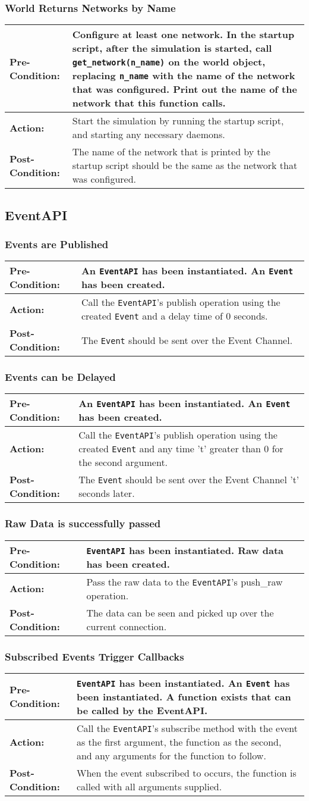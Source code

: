 \documentclass[titlepage]{article}
\newcommand{\testcase}[3]{
    \begin{center}
    \begin{tabular}{| l | p{0.7\textwidth}|}
        \hline
        \rowcolor[gray]{0.8}\textbf{Pre-Condition:} & #1 \\ \hline
        \textbf{Action:} & #2 \\ \hline
        \rowcolor[gray]{0.8}\textbf{Post-Condition:} & #3 \\ \hline
    \end{tabular}
    \end{center}
}
\begin{document}
\subsubsection{World Returns Networks by Name}
\testcase{Configure at least one network.  In the startup script, after the simulation is started, call \texttt{get\_network(n\_name)} on the world object, replacing \texttt{n\_name} with the name of the network that was configured.  Print out the name of the network that this function calls.}{Start the simulation by running the startup script, and starting any necessary daemons.}{The name of the network that is printed by the startup script should be the same as the network that was configured.}

\subsection{EventAPI}
\subsubsection{Events are Published}
\testcase{An \texttt{EventAPI} has been instantiated. An \texttt{Event} has been created.}{Call the \texttt{EventAPI}'s publish operation using the created \texttt{Event} and a delay time of 0 seconds.}{The \texttt{Event} should be sent over the Event Channel.}

\subsubsection{Events can be Delayed}
\testcase{An \texttt{EventAPI} has been instantiated. An \texttt{Event} has been created.}{Call the \texttt{EventAPI}'s publish operation using the created \texttt{Event} and any time 't' greater than 0 for the second argument.}{The \texttt{Event} should be sent over the Event Channel 't' seconds later.}

\subsubsection{Raw Data is successfully passed}
\testcase{\texttt{EventAPI} has been instantiated. Raw data has been created.}{Pass the raw data to the \texttt{EventAPI}'s push\_raw operation.}{The data can be seen and picked up over the current connection.}


\subsubsection{Subscribed Events Trigger Callbacks}
\testcase{\texttt{EventAPI} has been instantiated.  An \texttt{Event} has been instantiated. A function exists that can be called by the EventAPI.}{Call the \texttt{EventAPI}'s subscribe method with the event as the first argument, the function as the second, and any arguments for the function to follow.}{When the event subscribed to occurs, the function is called with all arguments supplied. }
\end{document}
